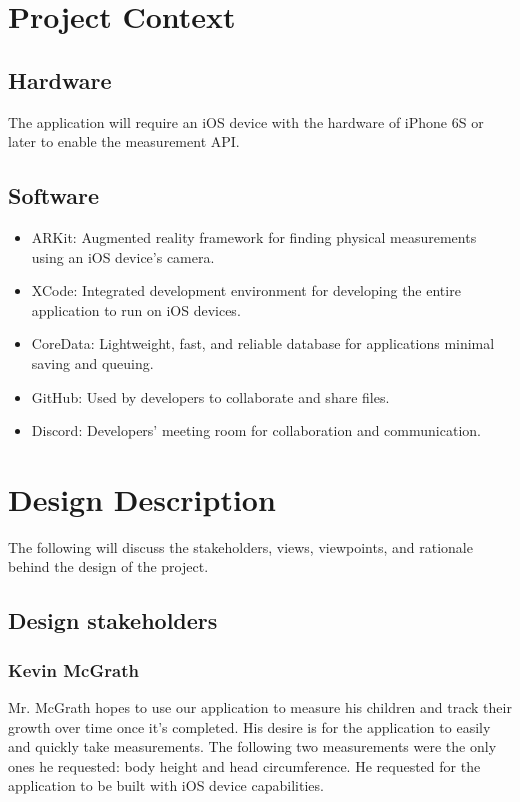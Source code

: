 \documentclass[onecolumn, draftclsnofoot,10pt, compsoc]{IEEEtran}
\begin{document}


\section{Project Context}
\subsection{Hardware}
The application will require an iOS device with the hardware of iPhone 6S or later to enable the measurement API.

\subsection{Software}
\begin{itemize}
  \item ARKit: Augmented reality framework for finding physical measurements using an iOS device's camera.
  \item XCode: Integrated development environment for developing the entire application to run on iOS devices.
  \item CoreData: Lightweight, fast, and reliable database for applications minimal saving and queuing.
  \item GitHub: Used by developers to collaborate and share files.
  \item Discord: Developers' meeting room for collaboration and communication.
\end{itemize}


\section{Design Description}
The following will discuss the stakeholders, views, viewpoints, and rationale behind the design of the project.
\subsection{Design stakeholders}

\subsubsection{Kevin McGrath}
Mr. McGrath hopes to use our application to measure his children and track their growth over time once it's completed. His desire is for the application to easily and quickly take measurements. The following two measurements were the only ones he requested: body height and head circumference. He requested for the application to be built with iOS device capabilities.
\end{document}
